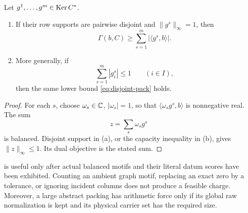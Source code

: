 \begin{theorem}\label{thm:packing}
Let \(g^1,\ldots,g^m\in\operatorname{Ker} C^*\).
\begin{enumerate}[label=(\alph*),leftmargin=2.4em]
\item If their row supports are pairwise disjoint and
\(\|g^s\|_\infty=1\), then
\begin{equation}\label{eq:disjoint-pack}
 \Gamma(b,C)\ge
 \sum_{s=1}^m|\langle g^s,b\rangle|.
\end{equation}
\item More generally, if
\begin{equation}\label{eq:capacity}
 \sum_{s=1}^m|g_i^s|\le1
 \qquad(i\in I),
\end{equation}
then the same lower bound \eqref{eq:disjoint-pack} holds.
\end{enumerate}
\end{theorem}

\begin{proof}
For each \(s\), choose \(\omega_s\in\mathbb C\), \(|\omega_s|=1\), so that
\(\langle \omega_s g^s,b\rangle\) is nonnegative real.  The sum
\[
 z=\sum_s\omega_s g^s
\]
is balanced.  Disjoint support in (a), or the capacity inequality in
(b), gives \(\|z\|_\infty\le1\).  Its dual objective is the stated sum.
\end{proof}

\begin{remark}
 is useful only after actual balanced motifs and their
literal datum scores have been exhibited.  Counting an ambient graph
motif, replacing an exact zero by a tolerance, or ignoring incident
columns does not produce a feasible charge.  Moreover, a large abstract
packing has arithmetic force only if its global raw normalization is
kept and its physical carrier set has the required size.
\end{remark}

